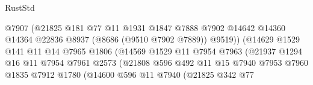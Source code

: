\begin{lexlean}{RustStd}
\begin{coremodule}
                                        @7907
                                        (@21825
                                          @181
                                          @77
                                          @11
                                          @1931
                                          @1847
                                          @7888
                                          @7902
                                          @14642
                                          @14360
                                          @14364
                                          @22836
                                          @8937
                                          (@8686 (@9510 @7902 @7889))
                                          @9519))
                                      (@14629
                                        @1529
                                        @141
                                        @11
                                        @14
                                        @7965
                                        @1806
                                        (@14569
                                          @1529
                                          @11
                                          @7954
                                          @7963
                                          (@21937
                                            @1294
                                            @16
                                            @11
                                            @7954
                                            @7961
                                            @2573
                                            (@21808
                                              @596
                                              @492
                                              @11
                                              @15
                                              @7940
                                              @7953
                                              @7960
                                              @1835
                                              @7912
                                              @1780
                                              (@14600
                                                @596
                                                @11
                                                @7940
                                                (@21825
                                                  @342
                                                  @77

\end{coremodule}
\end{lexlean}
